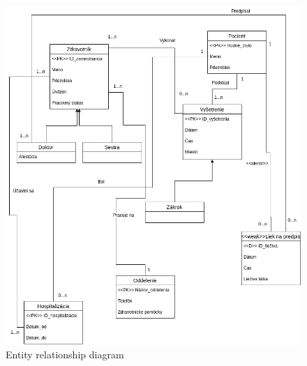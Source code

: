 \begin{figure}[h]
    \centering
    \includegraphics[width = \textwidth]{src/img/nemocnice_ER_DIAGRAM_1.jpg}
    \caption{Entity relationship diagram}
    \label{fig:er_diagram}
\end{figure}
